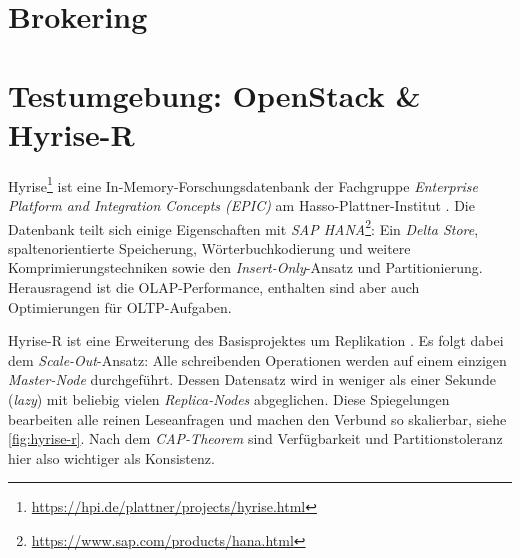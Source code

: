 \section{Brokering}



%
%
%
%
%
%
%


%
%
%
%
%

\section{Testumgebung: OpenStack \& Hyrise-R}

Hyrise\footnote{\url{https://hpi.de/plattner/projects/hyrise.html}} ist eine In-Memory-Forschungsdatenbank der Fachgruppe \emph{Enterprise Platform and Integration Concepts (EPIC)} am Hasso-Plattner-Institut \cite{grund:2010:hyrise}. Die Datenbank teilt sich einige Eigenschaften mit \emph{SAP HANA}\footnote{\url{https://www.sap.com/products/hana.html}}: Ein \emph{Delta Store}, spaltenorientierte Speicherung, Wörterbuchkodierung und weitere Komprimierungstechniken sowie den \emph{Insert-Only}-Ansatz und Partitionierung. Herausragend ist die OLAP-Performance, enthalten sind aber auch Optimierungen für OLTP-Aufgaben.

Hyrise-R ist eine Erweiterung des Basisprojektes um Replikation \cite{schwalb:2015:hyrise-r}. Es folgt dabei dem \emph{Scale-Out}-Ansatz: Alle schreibenden Operationen werden auf einem einzigen \emph{Master-Node} durchgeführt. Dessen Datensatz wird in weniger als einer Sekunde (\emph{lazy}) mit beliebig vielen \emph{Replica-Nodes} abgeglichen. Diese Spiegelungen bearbeiten alle reinen Leseanfragen und machen den Verbund so skalierbar, siehe \autoref{fig:hyrise-r}. Nach dem \emph{CAP-Theorem} sind Verfügbarkeit und Partitionstoleranz hier also wichtiger als Konsistenz. 

